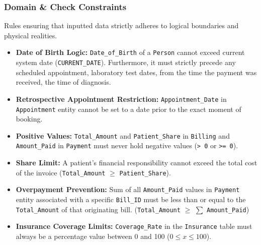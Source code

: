 \documentclass[12pt,a4paper]{article}
\begin{document}
\subsubsection*{Domain \& Check Constraints}
Rules ensuring that inputted data strictly adheres to logical boundaries and physical realities.
\begin{itemize}[label=\textbf{--}]

	\item \textbf{Date of Birth Logic:} \texttt{Date\_of\_Birth} of a \texttt{Person} cannot exceed current system date (\texttt{CURRENT\_DATE}). Furthermore, it must strictly precede any scheduled appointment, laboratory test dates, from the time the payment was received, the time of diagnosis.
	\item \textbf{Retrospective Appointment Restriction:} \texttt{Appointment\_Date} in \texttt{Appointment} entity cannot be set to a date prior to the exact moment of booking.
	\item \textbf{Positive Values:} \texttt{Total\_Amount} and \texttt{Patient\_Share} in \texttt{Billing} and \texttt{Amount\_Paid} in \texttt{Payment} must never hold negative values (\texttt{> 0} or \texttt{>= 0}).
	\item \textbf{Share Limit:} A patient's financial responsibility cannot exceed the total cost of the invoice (\texttt{Total\_Amount} $\geq$ \texttt{Patient\_Share}).
	\item \textbf{Overpayment Prevention:} Sum of all \texttt{Amount\_Paid} values in \texttt{Payment} entity associated with a specific \texttt{Bill\_ID} must be less than or equal to the \texttt{Total\_Amount} of that originating bill.
	      (\texttt{Total\_Amount} $\geq$ $\sum$ \texttt{Amount\_Paid})
	\item \textbf{Insurance Coverage Limits:} \texttt{Coverage\_Rate} in the \texttt{Insurance} table must always be a percentage value between 0 and 100 ($0 \le x \le 100$).
\end{itemize}
\end{document}
